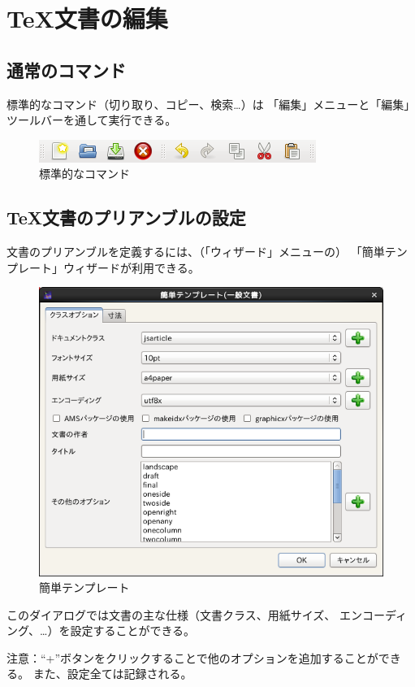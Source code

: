 \chapter{TeX文書の編集}

\section{通常のコマンド}

標準的なコマンド（切り取り、コピー、検索…）は
「編集」メニューと「編集」ツールバーを通して実行できる。

\begin{figure}[H]
  \centering
  \includegraphics{doc1.png}
  \caption{標準的なコマンド}
\end{figure}

\section{TeX文書のプリアンブルの設定}

文書のプリアンブルを定義するには、（「ウィザード」メニューの）
「簡単テンプレート」ウィザードが利用できる。

\begin{figure}[H]
  \centering
  \includegraphics[width=.8\linewidth]{doc2.png}
  \caption{簡単テンプレート}
\end{figure}

このダイアログでは文書の主な仕様（文書クラス、用紙サイズ、
エンコーディング、…）を設定することができる。

注意：``+''ボタンをクリックすることで他のオプションを追加することができる。
また、設定全ては記録される。

